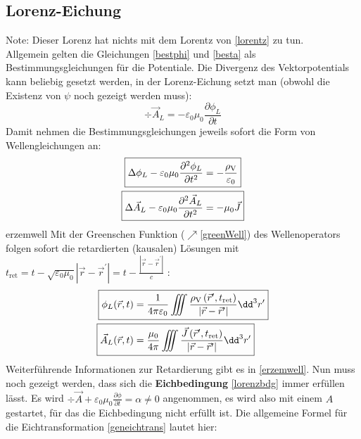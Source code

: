 \subsection{Lorenz-Eichung}\label{lorenzeich}
Note: Dieser Lorenz hat nichts mit dem Lorentz von \ref{lorentz} zu tun.\\
Allgemein gelten die Gleichungen \ref{bestphi} und \ref{besta} als Bestimmungsgleichungen für die Potentiale. Die Divergenz des Vektorpotentials kann beliebig gesetzt werden, in der  Lorenz-Eichung setzt man (obwohl die Existenz von $\psi$ noch gezeigt werden muss):
\begin{equation}\label{lorenzbdg}
	\boxed{\div \vec{{A}}_{{L}}=-\varepsilon_{0} \mu_{0} \frac{\partial \phi_{{L}}}{\partial {t}} }
\end{equation}
Damit nehmen die Bestimmungsgleichungen jeweils sofort die Form von Wellengleichungen an:
\begin{align}
	\Aboxed{\Delta \phi_{{L}}-\varepsilon_{0} \mu_{0} \frac{\partial^{2} \phi_{{L}}}{\partial {t}^{2}} & =-\frac{\rho_\text{V}}{\varepsilon_{0}}} \label{bestskalarpotlor}\\
	\Aboxed{\Delta \vec{{A}}_{{L}}-\varepsilon_{0} \mu_{0} \frac{\partial^{2} \vec{{A}}_{{L}}}{\partial {t}^{2}} & =-\mu_{0} \vec{{J}}}\label{bestvekpotlor}
\end{align}
erzemwell
Mit der Greenschen Funktion ($\nearrow$\ref{greenWell}) des Wellenoperators folgen sofort die retardierten (kausalen) Lösungen mit $t_{\text{ret}}={t}-\sqrt{\varepsilon_{0} \mu_{0}}\left|\vec{{r}}-\vec{{r}}^{\prime}\right|={t}-\frac{\left|\vec{{r}}-\vec{{r}}^{\prime}\right|}{{c}}$ :
\begin{align}
	\Aboxed{\phi_{{L}}(\vec{{r}}, {t})&=\frac{1}{4 \pi \varepsilon_{0}} \iiint \frac{\rho_\text{V}\left(\vec{{r}}^{\prime}, {t}_{\text{ret}}\right)}{\left|\vec{{r}}-\vec{{r}}^{\prime}\right|} \dd^3 {r}^{\prime}}\label{skalarpotlor}\\
	 \Aboxed{\vec{{A}}_{{L}}(\vec{{r}}, {t})&=\frac{\mu_{0}}{4 \pi} \iiint \frac{\vec{{J}}\left(\vec{{r}}^{\prime}, {t}_{\text{ret}}\right)}{\left|\vec{{r}}-\vec{{r}}^{\prime}\right|} \dd^3 {r}^{\prime}} \label{vekpotlor}
\end{align}
Weiterführende Informationen zur Retardierung gibt es in \ref{erzemwell}. Nun muss noch gezeigt werden, dass sich die \textbf{Eichbedingung} \ref{lorenzbdg} immer erfüllen lässt. Es wird $\div \vec{{A}}+\varepsilon_{0} \mu_{0} \frac{\partial \phi}{\partial {t}}=\alpha \neq 0$ angenommen, es wird also mit einem $A$ gestartet, für das die Eichbedingung nicht erfüllt ist. Die allgemeine Formel für die Eichtransformation \ref{geneichtrans} lautet hier:
